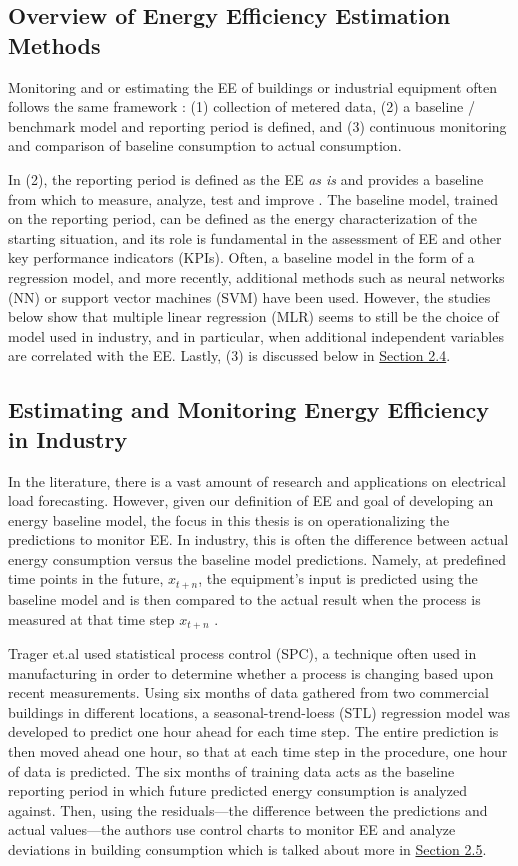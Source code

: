 \subsection{Overview of Energy Efficiency Estimation Methods}

Monitoring and or estimating the EE of buildings or industrial equipment often follows the same framework \cite{kini_methodology_2011}: (1) collection of metered data, (2) a baseline / benchmark model and reporting period is defined, and (3) continuous monitoring and comparison of baseline consumption to actual consumption. 

In (2), the reporting period is defined as the EE \textit{as is} and provides a baseline from which to measure, analyze, test and improve \cite{oakland_statistical_2008}. The baseline model, trained on the reporting period, can be defined as the energy characterization of the starting situation, and its role is fundamental in the assessment of EE and other key performance indicators (KPIs). Often, a baseline model in the form of a regression model, and more recently, additional methods such as neural networks (NN) or support vector machines (SVM) have been used. However, the studies below show that multiple linear regression (MLR) seems to still be the choice of model used in industry, and in particular, when additional independent variables are correlated with the EE. Lastly, (3) is discussed below in \hyperlink{subsection.2.4}{Section 2.4}.

\subsection{Estimating and Monitoring Energy Efficiency in Industry}

In the literature, there is a vast amount of research and applications on electrical load forecasting. However, given our definition of EE and goal of developing an energy baseline model, the focus in this thesis is on operationalizing the predictions to monitor EE. In industry, this is often the difference between actual energy consumption versus the baseline model predictions. Namely, at predefined time points in the future, $x_{t+n}$, the equipment's input is predicted using the baseline model and is then compared to the actual result when the process is measured at that time step $x_{t+n}$ \cite{tightening}. 

Trager et.al \cite{tightening} used statistical process control (SPC), a technique often used in manufacturing in order to determine whether a process is changing based upon recent measurements. Using six months of data gathered from two commercial buildings in different locations, a seasonal-trend-loess (STL) regression model was developed to predict one hour ahead for each time step. The entire prediction is then moved ahead one hour, so that at each time step in the procedure, one hour of data is predicted. The six months of training data acts as the baseline reporting period in which future predicted energy consumption is analyzed against. Then, using the residuals—the difference between the predictions and actual values—the authors use control charts to monitor EE and analyze deviations in building consumption which is talked about more in \hyperlink{subsection.2.5}{Section 2.5}. 


